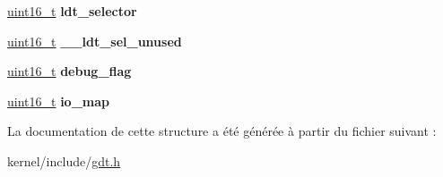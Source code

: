 \begin{DoxyCompactItemize}
\item 
\hypertarget{structtss_a934b41d2a63e759757d3afa0fab227c1}{\hyperlink{kernel_2include_2types_8h_adf4d876453337156dde61095e1f20223}{uint16\-\_\-t} {\bfseries ldt\-\_\-selector}}\label{structtss_a934b41d2a63e759757d3afa0fab227c1}

\item 
\hypertarget{structtss_a927509e57cfd273e377cec7368aedb50}{\hyperlink{kernel_2include_2types_8h_adf4d876453337156dde61095e1f20223}{uint16\-\_\-t} {\bfseries \-\_\-\-\_\-ldt\-\_\-sel\-\_\-unused}}\label{structtss_a927509e57cfd273e377cec7368aedb50}

\item 
\hypertarget{structtss_acfac9fc24de46f84d90c08d1b9b439e3}{\hyperlink{kernel_2include_2types_8h_adf4d876453337156dde61095e1f20223}{uint16\-\_\-t} {\bfseries debug\-\_\-flag}}\label{structtss_acfac9fc24de46f84d90c08d1b9b439e3}

\item 
\hypertarget{structtss_a25381c4288df77c8ab283299a1a288e8}{\hyperlink{kernel_2include_2types_8h_adf4d876453337156dde61095e1f20223}{uint16\-\_\-t} {\bfseries io\-\_\-map}}\label{structtss_a25381c4288df77c8ab283299a1a288e8}

\end{DoxyCompactItemize}


La documentation de cette structure a été générée à partir du fichier suivant \-:\begin{DoxyCompactItemize}
\item 
kernel/include/\hyperlink{gdt_8h}{gdt.\-h}\end{DoxyCompactItemize}
